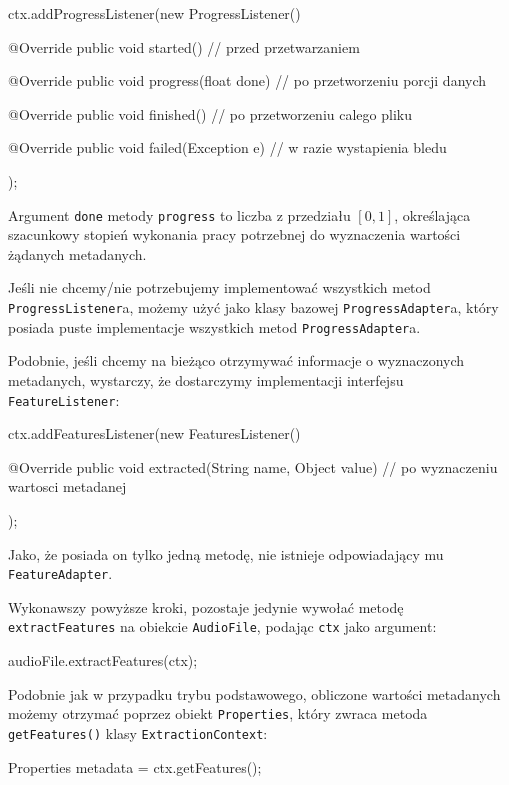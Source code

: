\begin{java}
ctx.addProgressListener(new ProgressListener() {

    @Override
    public void started() {
        // przed przetwarzaniem
    }

    @Override
    public void progress(float done) {
        // po przetworzeniu porcji danych
    }

    @Override
    public void finished() {
        // po przetworzeniu calego pliku
    }

    @Override
    public void failed(Exception e) {
        // w razie wystapienia bledu
    }
});
\end{java}

Argument \texttt{done} metody \texttt{progress} to liczba z przedziału $[0, 1]$, określająca
szacunkowy stopień wykonania pracy potrzebnej do wyznaczenia wartości żądanych metadanych.

Jeśli nie chcemy/nie potrzebujemy implementować wszystkich metod \texttt{ProgressListener}a, możemy
użyć jako klasy bazowej \texttt{ProgressAdapter}a, który posiada puste implementacje wszystkich
metod \texttt{ProgressAdapter}a.

Podobnie, jeśli chcemy na bieżąco otrzymywać informacje o wyznaczonych metadanych, wystarczy, że
dostarczymy implementacji interfejsu \texttt{FeatureListener}:

\begin{java}
ctx.addFeaturesListener(new FeaturesListener() {

    @Override
    public void extracted(String name, Object value) {
        // po wyznaczeniu wartosci metadanej
    }
});
\end{java}

Jako, że posiada on tylko jedną metodę, nie istnieje odpowiadający mu \texttt{FeatureAdapter}.

Wykonawszy powyższe kroki, pozostaje jedynie wywołać metodę \texttt{extractFeatures} na obiekcie
\texttt{AudioFile}, podając \texttt{ctx} jako argument:

\begin{java}
audioFile.extractFeatures(ctx);
\end{java}

Podobnie jak w przypadku trybu podstawowego, obliczone wartości metadanych możemy otrzymać poprzez
obiekt \texttt{Properties}, który zwraca metoda \texttt{getFeatures()} klasy
\texttt{ExtractionContext}:

\begin{java}
Properties metadata = ctx.getFeatures();
\end{java}

